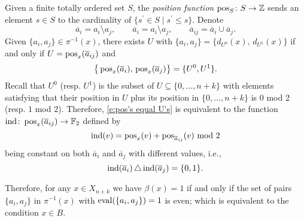 Given a finite totally ordered set $S$, the \textit{position function} $\operatorname{pos}_S \colon S \to \mathbb{Z}$ sends an element $s \in S$ to the cardinality of $\{s^\prime \in S \mid s^\prime \leq s\}$.
Denote
\begin{equation*}
\overline{a}_{i} = a_i \setminus a_j, \qquad
\overline{a}_{i} = a_i \setminus a_j, \qquad
\overline{a}_{ij} = \overline{a}_i \cup \overline{a}_j.
\end{equation*}
Given $\{a_i, a_j\} \in \pi^{-1}(x)$, there exists $U$ with $\{a_i, a_j\} = \{d_{U^0}(x),\, d_{U^1}(x)\}$
if and only if $U = \operatorname{pos}_{x}(\overline{a}_{ij})$ and
\begin{equation} \label{e:pos's equal U's}
\big\{\operatorname{pos}_{x}(\overline{a}_i),\, \operatorname{pos}_{x}(\overline{a}_j)\big\} = \{U^0, U^1\}.
\end{equation}
Recall that $U^0$ (resp. $U^1$) is the subset of $U \subseteq \{0, \dots, n+k\}$ with elements satisfying that their position in $U$ plus its position in $\{0, \dots, n+k\}$ is $0$ mod 2 (resp. $1$ mod 2).
Therefore, \eqref{e:pos's equal U's} is equivalent to the function $\mathrm{ind} \colon \operatorname{pos}_x(\overline{a}_{ij}) \to \mathbb{F}_2$ defined by
\begin{equation*}
\mathrm{ind}(v) = \operatorname{pos}_{x}(v) + \operatorname{pos}_{\overline{a}_{ij}}(v) \text{ mod }2
\end{equation*}
being constant on both $\overline{a}_i$ and $\overline{a}_j$ with different values, i.e., 
\begin{equation*}
\mathrm{ind}(\overline{a}_i) \operatorname{\triangle} \mathrm{ind}(\overline{a}_j) = \{0,1\}.
\end{equation*}

Therefore, for any $x \in X_{n+k}$ we have $\beta(x) = 1$ if and only if the set of pairs $\{a_i, a_j\}$ in $\pi^{-1}(x)$ with $\operatorname{eval}(\{a_i, a_j\}) = 1$ is even; which is equivalent to the condition $x \in B$.